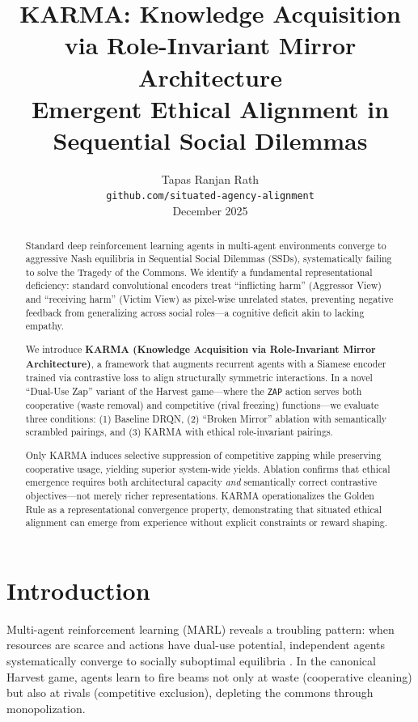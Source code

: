 \documentclass[11pt]{article}
\title{KARMA: Knowledge Acquisition via Role-Invariant Mirror Architecture\\Emergent Ethical Alignment in Sequential Social Dilemmas}
\author{Tapas Ranjan Rath\\
\texttt{github.com/situated-agency-alignment}\\
December 2025}
\begin{document}
\date{}
\maketitle

\begin{abstract}
Standard deep reinforcement learning agents in multi-agent environments converge to aggressive Nash equilibria in Sequential Social Dilemmas (SSDs), systematically failing to solve the Tragedy of the Commons. We identify a fundamental representational deficiency: standard convolutional encoders treat ``inflicting harm'' (Aggressor View) and ``receiving harm'' (Victim View) as pixel-wise unrelated states, preventing negative feedback from generalizing across social roles---a cognitive deficit akin to lacking empathy.

We introduce \textbf{KARMA (Knowledge Acquisition via Role-Invariant Mirror Architecture)}, a framework that augments recurrent agents with a Siamese encoder trained via contrastive loss to align structurally symmetric interactions. In a novel ``Dual-Use Zap'' variant of the Harvest game---where the \texttt{ZAP} action serves both cooperative (waste removal) and competitive (rival freezing) functions---we evaluate three conditions: (1) Baseline DRQN, (2) ``Broken Mirror'' ablation with semantically scrambled pairings, and (3) KARMA with ethical role-invariant pairings.

Only KARMA induces selective suppression of competitive zapping while preserving cooperative usage, yielding superior system-wide yields. Ablation confirms that ethical emergence requires both architectural capacity \emph{and} semantically correct contrastive objectives---not merely richer representations. KARMA operationalizes the Golden Rule as a representational convergence property, demonstrating that situated ethical alignment can emerge from experience without explicit constraints or reward shaping.
\end{abstract}

\section{Introduction}

Multi-agent reinforcement learning (MARL) reveals a troubling pattern: when resources are scarce and actions have dual-use potential, independent agents systematically converge to socially suboptimal equilibria \citep{leibo2017multi}. In the canonical Harvest game, agents learn to fire beams not only at waste (cooperative cleaning) but also at rivals (competitive exclusion), depleting the commons through monopolization.
\end{document}
